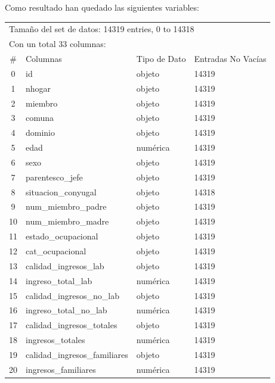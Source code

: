 \documentclass[a4paper]{article}
\begin{document}
    Como resultado han quedado las siguientes variables:
    
    \begin{table}[H]
        \centering
        \begin{tabular}{clll}
            \multicolumn{4}{l}{Tamaño del set de datos: 14319 entries, 0 to 14318} \\
            \multicolumn{4}{l}{Con un total 33 columnas:} \\
            \toprule
            \#  & Columnas & Tipo de Dato & Entradas No Vacías \\ \midrule
            0   & id & objeto & 14319 \\ 
            1   & nhogar & objeto & 14319 \\ 
            2   & miembro & objeto & 14319 \\ 
            3   & comuna & objeto & 14319 \\ 
            4   & dominio & objeto & 14319 \\ 
            5   & edad & numérica & 14319 \\ 
            6   & sexo & objeto & 14319 \\ 
            7   & parentesco\_jefe & objeto & 14319 \\ 
            8   & situacion\_conyugal & objeto & 14318 \\ 
            9   & num\_miembro\_padre & objeto & 14319 \\ 
            10  & num\_miembro\_madre & objeto & 14319 \\ 
            11  & estado\_ocupacional & objeto & 14319 \\ 
            12  & cat\_ocupacional & objeto & 14319 \\ 
            13  & calidad\_ingresos\_lab & objeto & 14319 \\ 
            14  & ingreso\_total\_lab & numérica & 14319 \\ 
            15  & calidad\_ingresos\_no\_lab & objeto & 14319 \\ 
            16  & ingreso\_total\_no\_lab & numérica & 14319 \\ 
            17  & calidad\_ingresos\_totales & objeto & 14319 \\ 
            18  & ingresos\_totales & numérica & 14319 \\ 
            19  & calidad\_ingresos\_familiares & objeto & 14319 \\ 
            20  & ingresos\_familiares & numérica & 14319 \\ 

\end{tabular}
\end{table}
\end{document}
